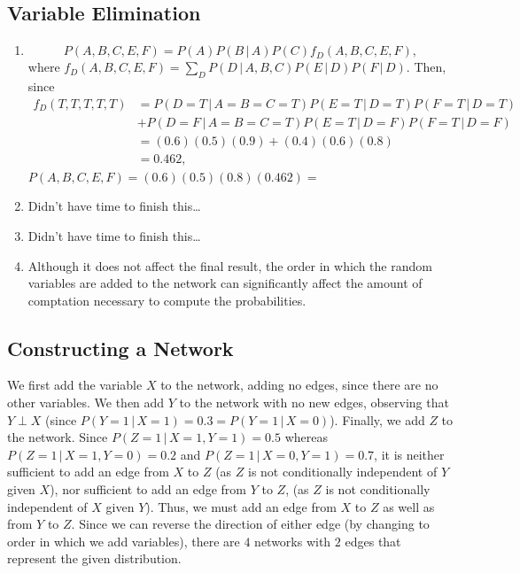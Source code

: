 \documentclass[11pt]{article}
\newcommand{\pr}[1]{\mathsf{P}\left( #1 \right)} %
\newcommand{\giv}{\, | \,} %
\begin{document}
\subsection{Variable Elimination}
\begin{enumerate}[1.]
\item
\[P(A,B,C,E,F) = P(A) P(B \giv A) P(C) f_D(A,B,C,E,F),\]
where $f_D(A,B,C,E,F) = \sum_{D} P(D \giv A,B,C) P(E \giv D) P(F \giv D)$.
Then, since
\begin{align*}
f_D(T,T,T,T,T)
 & = P(D = T \giv A = B = C = T) P(E = T \giv D = T) P(F = T \giv D = T) \\
 & + P(D = F \giv A = B = C = T) P(E = T \giv D = F) P(F = T \giv D = F) \\
 & = (0.6)(0.5)(0.9) + (0.4)(0.6)(0.8)                                   \\
 & = 0.462,
\end{align*}
$P(A,B,C,E,F) = (0.6)(0.5)(0.8)(0.462) = $

\item
Didn't have time to finish this\ldots

\item
Didn't have time to finish this\ldots

\item Although it does not affect the final result, the order in which the
random variables are added to the network can significantly affect the amount
of comptation necessary to compute the probabilities.

\end{enumerate}

\subsection{Constructing a Network}
We first add the variable $X$ to the network, adding no edges, since there are
no other variables. We then add $Y$ to the network with no new edges,
observing that $Y \perp X$ (since
$P(Y = 1 \, | \, X = 1) = 0.3 = P(Y = 1 \, | \, X = 0)$). Finally, we add $Z$
to the network. Since $P(Z = 1 \, | \, X = 1, Y = 1) = 0.5$ whereas
$P(Z = 1 \, | \, X = 1, Y = 0) = 0.2$ and
$P(Z = 1 \, | \, X = 0, Y = 1) = 0.7$, it is neither sufficient to add an
edge from $X$ to $Z$ (as $Z$ is not conditionally independent of $Y$ given
$X$), nor sufficient to add an edge from $Y$ to $Z$, (as $Z$ is not
conditionally independent of $X$ given $Y$). Thus, we must add an edge from
$X$ to $Z$ as well as from $Y$ to $Z$. Since we can reverse the direction of
either edge (by changing to order in which we add variables), there are $4$
networks with $2$ edges that represent the given distribution.
\end{document}
